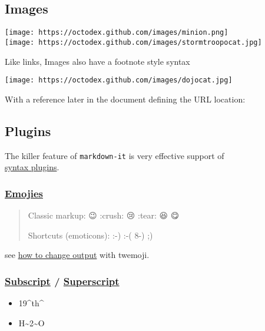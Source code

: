 \documentclass[]{article}
\providecommand{\tightlist}{%
  \setlength{\itemsep}{0pt}\setlength{\parskip}{0pt}}
\begin{document}
\subsection{Images}\label{images}

\texttt{[image: https://octodex.github.com/images/minion.png]}\\
\texttt{[image: https://octodex.github.com/images/stormtroopocat.jpg]}

Like links, Images also have a footnote style syntax

\texttt{[image: https://octodex.github.com/images/dojocat.jpg]}

With a reference later in the document defining the URL location:

\subsection{Plugins}\label{plugins}

The killer feature of \texttt{markdown-it} is very effective support
of\\
\href{https://www.npmjs.org/browse/keyword/markdown-it-plugin}{syntax
plugins}.

\subsubsection{\texorpdfstring{\href{https://github.com/markdown-it/markdown-it-emoji}{Emojies}}{Emojies}}\label{emojies}

\begin{quote}
Classic markup: 😉 :crush: 😢 :tear: 😆 😋

Shortcuts (emoticons): :-) :-( 8-) ;)
\end{quote}

see
\href{https://github.com/markdown-it/markdown-it-emoji\#change-output}{how
to change output} with twemoji.

\subsubsection{\texorpdfstring{\href{https://github.com/markdown-it/markdown-it-sub}{Subscript}
/
\href{https://github.com/markdown-it/markdown-it-sup}{Superscript}}{Subscript / Superscript}}\label{subscript-superscript}

\begin{itemize}
\tightlist
\item
  19\^{}th\^{}
\item
  H\textasciitilde{}2\textasciitilde{}O
\end{itemize}
\end{document}
